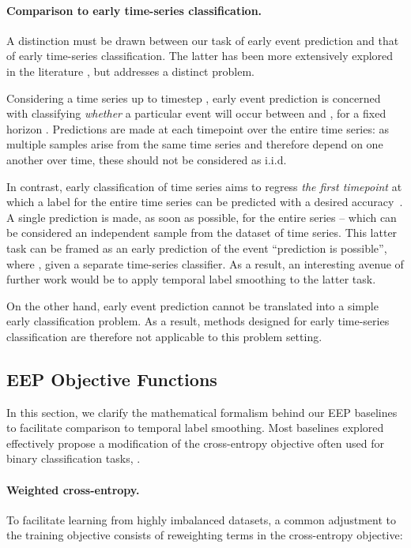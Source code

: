 \documentclass[nohyperref]{article}
\begin{document}
{ \paragraph{Comparison to early time-series classification.} 

A distinction must be drawn between our task of early event prediction and that of early time-series classification. The latter has been more extensively explored in the literature \citep{Xing2009,He2013,Yang2021dir}, but addresses a distinct problem. 

Considering a time series up to timestep , early event prediction is concerned with classifying \textit{whether} a particular event will occur between  and , for a fixed horizon . Predictions are made at each timepoint over the entire time series: as multiple samples arise from the same time series and therefore depend on one another over time, these should not be considered as i.i.d.

In contrast, early classification of time series aims to regress \textit{the first timepoint}  at which a label for the entire time series can be predicted with a desired accuracy~\citep{Xing2009}. A single prediction is made, as soon as possible, for the entire series -- which can be considered an independent sample from the dataset of time series. This latter task can be framed as an early prediction of the event “prediction is possible”, where , given a separate time-series classifier. As a result, an interesting avenue of further work would be to apply temporal label smoothing to the latter task.

On the other hand, early event prediction cannot be translated into a simple early classification problem. As a result, methods designed for early time-series classification are therefore not applicable to this problem setting. 

}

\subsection{EEP Objective Functions} \label{appendix:relatedwork}

In this section, we clarify the mathematical formalism behind our EEP baselines to facilitate comparison to temporal label smoothing. Most baselines explored effectively propose a modification of the cross-entropy objective often used for binary classification tasks, .

\paragraph{Weighted cross-entropy.} To facilitate learning from highly imbalanced datasets, a common adjustment to the training objective consists of reweighting terms in the cross-entropy objective:
\end{document}
